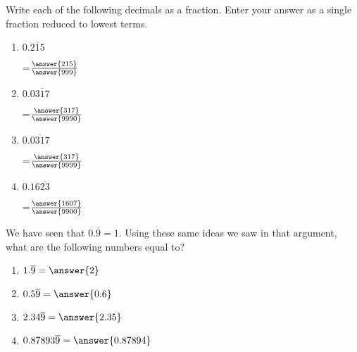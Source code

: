 \documentclass[nooutcomes]{ximera}
\begin{document}
\begin{problem}
Write each of the following decimals as a fraction.  Enter your answer as a single fraction reduced to lowest terms.

\begin{enumerate}
	\item $0.\overline{215}$ \begin{prompt} =$\frac{\answer{215}}{\answer{999}}$ \end{prompt}
	\item $0.0\overline{317}$ \begin{prompt} =$\frac{\answer{317}}{\answer{9990}}$ \end{prompt}
	\item $0.\overline{0317}$ \begin{prompt} =$\frac{\answer{317}}{\answer{9999}}$ \end{prompt}
	\item $0.16\overline{23}$ \begin{prompt} =$\frac{\answer{1607}}{\answer{9900}}$ \end{prompt}
\end{enumerate}
\end{problem}





\begin{problem}
 We have seen that $0.\overline{9} = 1$.  Using these same ideas we saw in that argument, what are the following numbers equal to?
 
 \begin{enumerate}
 	\item $1.\overline{9} = \answer{2}$
	\item $0.5\overline{9} = \answer{0.6}$
	\item $2.34\overline{9} = \answer{2.35}$
	\item $0.87893\overline{9} = \answer{0.87894}$
 \end{enumerate}
\end{problem}
\end{document}
